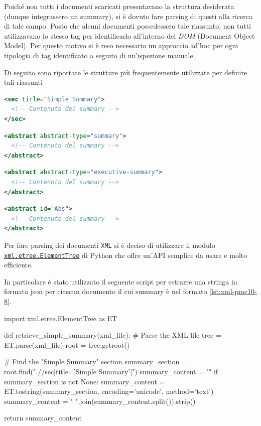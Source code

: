 \documentclass[12pt,a4paper,twoside,openright]{book}
\begin{document}
Poiché non tutti i documenti scaricati presentavano la struttura desiderata (dunque integrassero un summary), si è dovuto fare parsing di questi alla ricerca di tale campo. 
Posto che alcuni documenti possedessero tale riassunto, non tutti utilizzavano lo stesso tag per identificarlo all'interno del \emph{DOM} (Document Object Model). Per questo motivo si è reso necessario un approccio ad'hoc per ogni tipologia di tag identificato a seguito di un'ispezione manuale. 

Di seguito sono riportate le strutture più frequentemente utilizzate per definire tali riassunti 

\begin{lstlisting}[language=xml, caption=Struttura XML di un summary., label=lst:xml-pmc10-8]
<sec title="Simple Summary">
  <!-- Contenuto del summary -->
</sec>
\end{lstlisting}

\begin{lstlisting}[language=xml, caption=Struttura XML di un summary., label=lst:xml-pmc9]
<abstract abstract-type="summary">
  <!-- Contenuto del summary -->
</abstract>
\end{lstlisting}

\begin{lstlisting}[language=xml, caption=Struttura XML di un summary., label=lst:xml-pmc5]
<abstract abstract-type="executive-summary">
  <!-- Contenuto del summary -->
</abstract>
\end{lstlisting}

\begin{lstlisting}[language=xml, caption=Struttura XML di un summary., label=lst:xml-pmc7]
<abstract id="Abs">
  <!-- Contenuto del summary -->
</abstract>
\end{lstlisting}


Per fare parsing dei documenti \texttt{XML} si è deciso di utilizzare il modulo \href{https://docs.python.org/3/library/xml.html}{\texttt{xml.etree.ElementTree}} di Python che offre un'API semplice da usare e molto efficiente. 

In particolare è stato utilizzato il seguente script per estrarre una stringa in formato json per ciascun documento il cui summary è nel formato \ref{lst:xml-pmc10-8}.


\begin{python}[caption={Script Python per parsing della sezione `Simple Summary'.}, label={lst:py-pmc10-8}]
import xml.etree.ElementTree as ET

def retrieve_simple_summary(xml_file):
    # Parse the XML file
    tree = ET.parse(xml_file)
    root = tree.getroot()

    # Find the "Simple Summary" section
    summary_section = root.find(".//sec[title='Simple Summary']")
    summary_content = ""
    if summary_section is not None:
        summary_content = ET.tostring(summary_section, encoding='unicode', method='text')
        summary_content = " ".join(summary_content.split()).strip() 
    
    return summary_content
\end{python}
\end{document}
